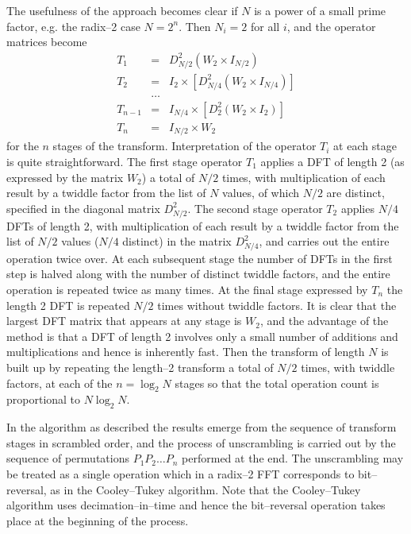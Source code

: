 \documentclass[dvips]{article}
\begin{document}
The usefulness of the approach becomes clear if $N$ is a power of a
small prime factor, e.g. the radix--2 case $N = 2^{n}$.  Then $N_{i}=2$
for all $i$, and the operator matrices become
\begin{eqnarray}
T_{1} & = & D_{N/2}^{2}\left(W_{2}\times I_{N/2}\right) \nonumber\\
T_{2} & = & I_{2}\times\left[D_{N/4}^{2}
\left(W_{2}\times I_{N/4}\right)\right] \nonumber\\
& \ldots & \nonumber\\
T_{n-1} & = & I_{N/4}\times\left[D_{2}^{2}
\left(W_{2}\times I_{2}\right)\right] \nonumber\\
T_{n} & = & I_{N/2}\times W_{2} \nonumber
\end{eqnarray}
for the $n$ stages of the transform.  Interpretation of the operator
$T_{i}$ at each stage is quite straightforward.
The first stage operator $T_{1}$
applies a DFT of length 2 (as expressed by the matrix $W_{2}$)
a total of $N/2$ times, with
multiplication of each result by a twiddle factor from the list of
$N$ values, of which $N/2$ are distinct, specified in the diagonal matrix
$D_{N/2}^{2}$.  The second stage operator $T_{2}$ applies
$N/4$ DFTs of length 2, with multiplication of each result by a twiddle
factor from the list of $N/2$ values ($N/4$ distinct) in the matrix
$D_{N/4}^{2}$,
and carries out the entire operation twice over.  At each subsequent
stage the number of DFTs in the first step is halved along with the
number of distinct twiddle factors, and the entire operation is repeated
twice as many times.  At the final stage expressed by $T_{n}$ the length
2 DFT is repeated $N/2$ times without twiddle factors.
It is clear that the largest DFT matrix that appears at
any stage is $W_{2}$, and the advantage of the method is that a DFT of length 2 
involves only a small number of additions and multiplications and hence is
inherently fast.  Then the transform of length $N$ is
built up by repeating the length--2 transform a total of $N/2$ times, with
twiddle factors, at each of the $n = \log_{2}{N}$ stages so that the total
operation count is proportional to $N\log_{2}{N}$.

In the algorithm as described the results emerge from the sequence of
transform stages in scrambled order, and the process of unscrambling is
carried out by the sequence of permutations $P_{1}P_{2}\ldots P_{n}$
performed at the end.  The unscrambling may be treated as a single operation
which in a radix--2 FFT corresponds to bit--reversal, as in the
Cooley--Tukey algorithm.  Note that the Cooley--Tukey algorithm uses
decimation--in--time and hence the bit--reversal operation takes place at
the beginning of the process.
 
\end{document}

